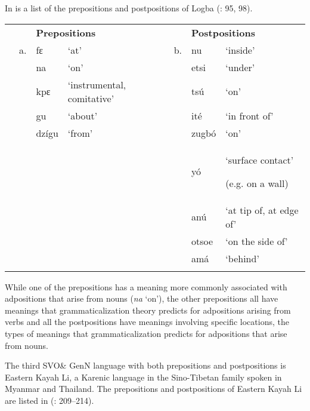 \documentclass[output=paper]{langsci/langscibook}
\begin{document}
In  is a list of the prepositions and postpositions of Logba (\citealt{Dorvlo2008}: 95, 98).


\begin{table}
\begin{tabularx}{\textwidth}{XXXXXXX} &  & \multicolumn{2}{X}{\bfseries Prepositions} &  & \multicolumn{2}{X}{\bfseries Postpositions}\\
\lsptoprule
& a. & fɛ & ‘at’ & b. & nu & ‘inside’\\
&  & na & ‘on’ &  & etsi & ‘under’\\
&  & kpɛ & ‘instrumental, comitative’ &  & tsú & ‘on’\\
&  & gu & ‘about’ &  & ité & ‘in front of’\\
&  & dzígu & ‘from’ &  & zugbó & ‘on’\\
&  &  &  &  & yó & {‘surface contact’}

(e.g. on a wall)\\
&  &  &  &  & anú & ‘at tip of, at edge of’\\
&  &  &  &  & otsoe & ‘on the side of’\\
&  &  &  &  & amá & ‘behind’\\
\lspbottomrule
\end{tabularx}
\end{table}


While one of the prepositions has a meaning more commonly associated with adpositions that arise from nouns (\textit{na} ‘on’), the other prepositions all have meanings that grammaticalization theory predicts for adpositions arising from verbs and all the postpositions have meanings involving specific locations, the types of meanings that grammaticalization predicts for adpositions that arise from nouns.

The third SVO\& GenN language with both prepositions and postpositions is Eastern Kayah Li, a Karenic language in the Sino-Tibetan family spoken in Myanmar and Thailand. The prepositions and postpositions of Eastern Kayah Li are listed in  (\citealt{Solnit1997}: 209–214).
\end{document}
